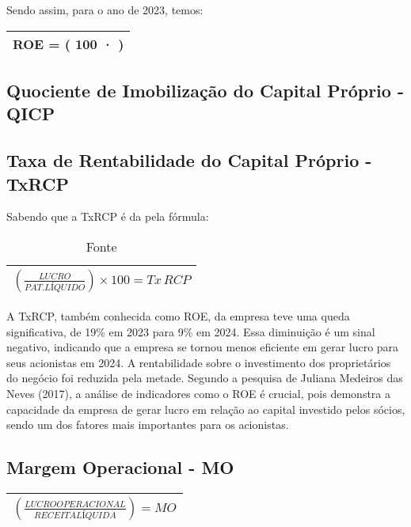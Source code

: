 \documentclass[1pt,a4paper]{article}
\begin{document}
	Sendo assim, para o ano de 2023, temos:
		\begin{center}
			\begin{tabular}{|c|}
				\hline
				ROE = \left( 100 · \left[ \frac{140.419}{PAT. \, LÍQUIDO} \right] \right)  \\
				\hline
			\end{tabular}
		\end{center}
		
	
	
	
	\subsection{Quociente de Imobilização do Capital Próprio - QICP}
	
	\subsection{Taxa de Rentabilidade do Capital Próprio - TxRCP}
	Sabendo que a TxRCP é da pela fórmula: 
	
	\begin{table}[h]
		\centering
		\begin{tabular}{|c|}
			\hline
			$\left( \frac{LUCRO}{PAT. LÍQUIDO} \right) \times 100 = Tx \, RCP$ \\
			\hline
		\end{tabular}
		\caption{Fonte}
		\label{tab:exemplo}
	\end{table}

	A TxRCP, também conhecida como ROE, da empresa teve uma queda significativa, de 19\% em 2023 para 9\% em 2024. Essa diminuição é um sinal negativo, indicando que a empresa se tornou menos eficiente em gerar lucro para seus acionistas em 2024. A rentabilidade sobre o investimento dos proprietários do negócio foi reduzida pela metade. Segundo a pesquisa de Juliana Medeiros das Neves (2017), a análise de indicadores como o ROE é crucial, pois demonstra a capacidade da empresa de gerar lucro em relação ao capital investido pelos sócios, sendo um dos fatores mais importantes para os acionistas.

	\subsection{Margem Operacional - MO}
	
	\begin{center}
		\begin{tabular}{|c|}
			\hline
			$\left( \frac{LUCRO OPERACIONAL}{RECEITA LÍQUIDA} \right) = MO$ \\
			\hline
		\end{tabular}
	\end{center}
\end{document}
